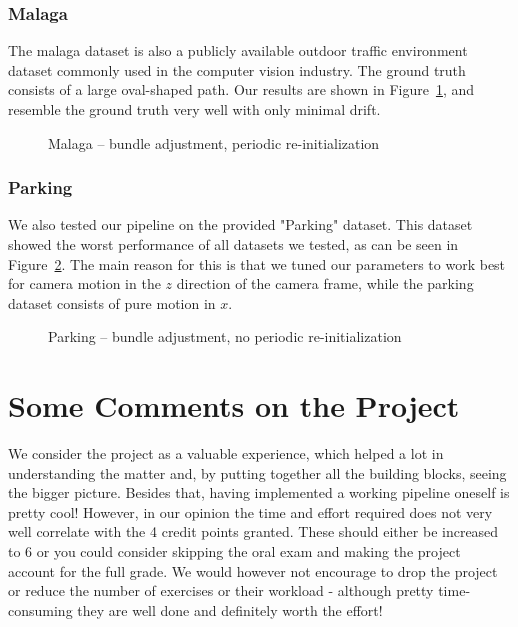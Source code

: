 \documentclass[11pt]{article}
\newlength\figureheight
\newlength\figurewidth
\begin{document}
\subsubsection{Malaga}
The malaga dataset is also a publicly available outdoor traffic environment dataset commonly used in the computer vision industry. The ground truth consists of a large oval-shaped path. Our results are shown in Figure~\ref{fig:malaga_BA_reinit}, and resemble the ground truth very well with only minimal drift.

\begin{figure}[h]
	\centering
	\setlength\figureheight{6cm} 
	\setlength\figurewidth{8cm}
	
	\caption{Malaga -- bundle adjustment, periodic re-initialization}
	\label{fig:malaga_BA_reinit}
\end{figure}

\subsubsection{Parking}
We also tested our pipeline on the provided "Parking" dataset. This dataset showed the worst performance of all datasets we tested, as can be seen in Figure~\ref{fig:parking_BA_reinit}. The main reason for this is that we tuned our parameters to work best for camera motion in the $z$ direction of the camera frame, while the parking dataset consists of pure motion in $x$.

\begin{figure}[h]
	\centering
	\setlength\figureheight{6cm} 
	\setlength\figurewidth{8cm}
	
	\caption{Parking -- bundle adjustment, no periodic re-initialization}
	\label{fig:parking_BA_reinit}
\end{figure}

\section*{Some Comments on the Project}
We consider the project as a valuable experience, which helped a lot in understanding the matter and, by putting together all the building blocks, seeing the bigger picture. Besides that, having implemented a working pipeline oneself is pretty cool! However, in our opinion the time and effort required does not very well correlate with the 4 credit points granted. These should either be increased to 6 or you could consider skipping the oral exam and making the project account for the full grade. We would however not encourage to drop the project or reduce the number of exercises or their workload - although pretty time-consuming they are well done and definitely worth the effort!

\end{document}
